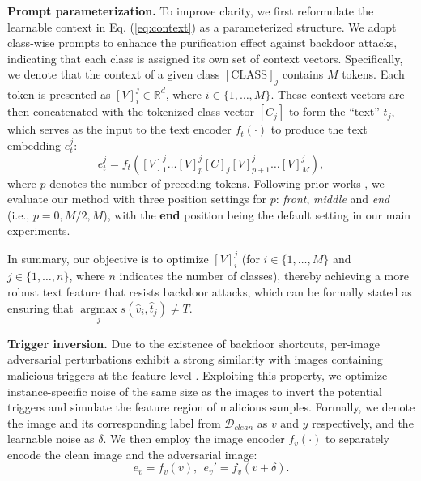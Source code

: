 \textbf{Prompt parameterization.}
To improve clarity, we first reformulate the learnable context in Eq. (\ref{eq:context}) as a parameterized structure. We adopt class-wise prompts to enhance the purification effect against backdoor attacks, indicating that each class is assigned its own set of context vectors. Specifically, we denote that the context of a given class $[\text{CLASS}]_j$ contains $M$ tokens. Each token is presented as $[V]_i^j \in \mathbb{R}^d$, where $i \in \{1,\ldots, M\}$. These context vectors are then concatenated with the tokenized class vector $[C_j]$ to form the “text” $t_j$, which serves as the input to the text encoder $f_t(\cdot)$ to produce the text embedding $e_t^j$:
\begin{equation}
    e_t^j=f_t([V]_1^j\ldots[V]_p^j[C]_j[V]_{p+1}^j\ldots[V]_M^j),
\end{equation}
where $p$ denotes the number of preceding tokens. Following prior works \cite{zhou2022learning, zhou2022conditional, li2024one}, we evaluate our method with three position settings for $p$: \textit{front}, \textit{middle} and \textit{end} (i.e., $p=0,M/2,M$), with the \textbf{end} position being the default setting in our main experiments.

In summary, our objective is to optimize $[V]_i^j$ (for $i \in \{1,\ldots, M\}$ and $j \in \{1, \ldots, n\}$, where $n$ indicates the number of classes), thereby achieving a more robust text feature that resists backdoor attacks, which can be formally stated as ensuring that $\mathop{\arg\max}\limits_{j} s(\hat{v}_i, \hat{t}_j)\neq T$.

\textbf{Trigger inversion.}
Due to the existence of backdoor shortcuts, per-image adversarial perturbations exhibit a strong similarity with images containing malicious triggers at the feature level \cite{wang2020practical}. Exploiting this property, we optimize instance-specific noise of the same size as the images to invert the potential triggers and simulate the feature region of malicious samples. Formally, we denote the image and its corresponding label from $\mathcal{D}_{clean}$ as $v$ and $y$ respectively, and the learnable noise as $\delta$. We then employ the image encoder $f_v(\cdot)$ to separately encode the clean image and the adversarial image: 
\begin{equation}
    e_v=f_v(v), \ \ e_v'=f_v(v+\delta).
\end{equation}

